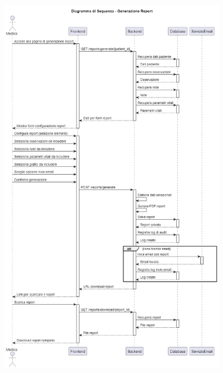 \documentclass[12pt,a4paper,oneside]{report}
\begin{document}
\begin{figure}[H]
    \centering
    \includegraphics[width=0.85\textwidth]{images/uml/ReportGeneration.png}
\end{figure}
\end{document}
